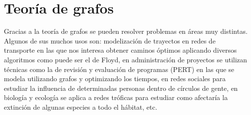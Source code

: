 	
\newpage

\section{Teoría de grafos}

Gracias a la teoría de grafos se pueden resolver problemas en áreas muy distintas.  Algunos de sus muchos usos son: modelización de trayectos en redes de transporte en las que nos interesa obtener caminos óptimos aplicando diversos algoritmos como puede ser el de Floyd, en administración de proyectos se utilizan técnicas como la de revisión y evaluación de programas (PERT) en las que se modela utilizando grafos y optimizando los tiempos, en redes sociales para estudiar la influencia de determinadas personas dentro de círculos de gente, en biología y ecología se aplica a redes tróficas para estudiar como afectaría la extinción de algunas especies a todo el hábitat, etc.\\

